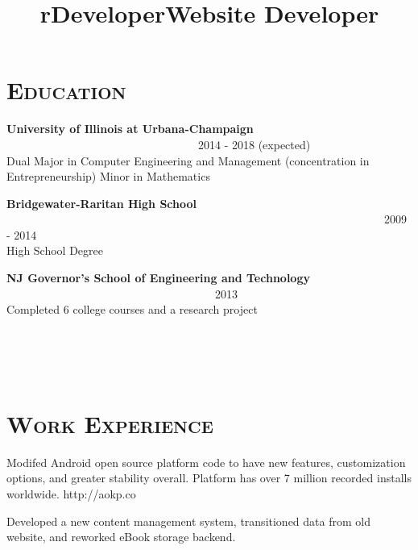\begin{resume}

\section{\textsc{Education}}

\textbf{University of Illinois at Urbana-Champaign} \ \ \ \ \ \ \ \ \ \ \ \ \ \ \ \ \ \ \ \ \ \ \ \ \ \ \ \ \ \ \ \ \ \ 2014 - 2018 (expected) \\
Dual Major in Computer Engineering and Management (concentration in Entrepreneurship)
Minor in Mathematics

\textbf{Bridgewater-Raritan High School} \ \ \ \ \ \ \ \ \ \ \ \ \ \ \ \ \ \ \ \ \ \ \ \ \ \ \ \ \ \ \ \ \ \ \ \ \ \ \ \ \ \ \ \ \ \ \ \ \ \ \ \ \ \ \ \ \ \ \ \ \ \ \ \ \ \ \ 2009 - 2014 \\
High School Degree

\textbf{NJ Governor's School of Engineering and Technology} \ \ \ \ \ \ \ \ \ \ \ \ \ \ \ \ \ \ \ \ \ \ \ \ \ \ \ \ \ \ \ \ \ \ \ \ \ 2013 \\ 
Completed 6 college courses and a research project

\begin{formatb}
  \title{r}\\
  \\
  \body\\
\end{formatb}

\section{\textsc{Work Experience}}

\title{Developer}
\begin{position}
Modifed Android open source platform code to have new features, customization options, and greater stability overall. Platform has over 7 million recorded installs worldwide. http://aokp.co
\end{position}

\title{Website Developer}
\begin{position}
Developed a new content management system, transitioned data from old website, and reworked eBook storage backend.
\end{position}


\end{resume}
